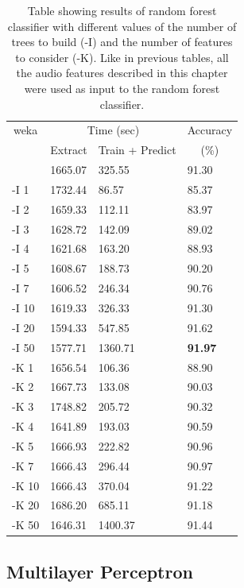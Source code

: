 \documentclass[12pt,oneside]{book}
\begin{document}
\begin{table}
\begin{tabular}{|l|l|l|l|}
\hline
\multicolumn{1}{|c|}{weka} & \multicolumn{2}{c|}{Time (sec)} & Accuracy \\
\hhline{|~|-|-|~|}
\multicolumn{1}{|c|}{param} & Extract & Train + Predict & \multicolumn{1}{c|}{(\%)} \\
\hhline{|=|=|=|=|}
        &  1665.07  &     325.55  &  91.30  \\
 -I 1   &  1732.44  &      86.57  &  85.37  \\
 -I 2   &  1659.33  &     112.11  &  83.97  \\
 -I 3   &  1628.72  &     142.09  &  89.02  \\
 -I 4   &  1621.68  &     163.20  &  88.93  \\
 -I 5   &  1608.67  &     188.73  &  90.20  \\
 -I 7   &  1606.52  &     246.34  &  90.76  \\
 -I 10  &  1619.33  &     326.33  &  91.30  \\
 -I 20  &  1594.33  &     547.85  &  91.62  \\
 -I 50  &  1577.71  &    1360.71  &  \textbf{91.97}  \\
\hline
 -K 1   &  1656.54  &     106.36  &  88.90  \\
 -K 2   &  1667.73  &     133.08  &  90.03  \\
 -K 3   &  1748.82  &     205.72  &  90.32  \\
 -K 4   &  1641.89  &     193.03  &  90.59  \\
 -K 5   &  1666.93  &     222.82  &  90.96  \\
 -K 7   &  1666.43  &     296.44  &  90.97  \\
 -K 10  &  1666.43  &     370.04  &  91.22  \\
 -K 20  &  1686.20  &     685.11  &  91.18  \\
 -K 50  &  1646.31  &    1400.37  &  91.44  \\
\hline
\end{tabular}
\caption{Table showing results of random forest
  classifier with different values of the number of trees to build
  (-I) and the number of features to consider (-K).  Like in previous
  tables, all the audio features described in this chapter were used
  as input to the random forest classifier.}
\label{table:obv-weka-randomForest}
\end{table}

%
%
\subsection{Multilayer Perceptron}
\end{document}
